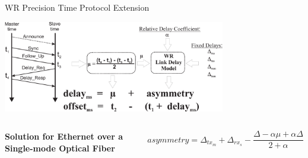 \documentclass[compress,red]{beamer}
\begin{document}
\begin{frame}{WR Precision Time Protocol Extension}

  \begin{center}
  \includegraphics[height=4cm]{protocol/wrLinkModel.pdf}

  \end{center}

  \begin{columns}[c]
  \column{1.5in}

    \begin{center}
      \textbf{Solution for Ethernet over a Single-mode Optical Fiber}
    \end{center}    

  \column{2.7in}

    \begin{equation}
      \nonumber asymmetry = \Delta_{tx_m} + \Delta_{rx_s} - \frac{\Delta - \alpha \mu + \alpha \Delta}{2 + \alpha}
    \end{equation}

  \end{columns}

\end{frame}
\end{document}
